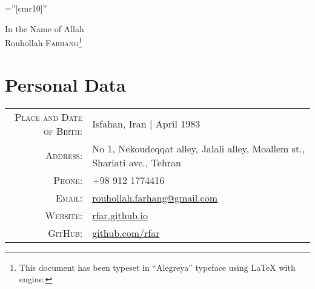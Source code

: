 \documentclass[a4paper,10pt]{article}
\begin{document}

\pagestyle{empty} %

\font\fb=''[cmr10]'' %

\par{\centering
		{\small In the Name of Allah}\\
		\vspace{22mm}
		{\Huge Rouhollah \textsc{Farhang}\footnote{This document has been typeset in “Alegreya” typeface using {\fb \LaTeX} with {\fb \XeLaTeX} engine.}
	}\bigskip\par}

\section{Personal Data}


\begin{tabular}{rl}
    \textsc{Place and Date of Birth:} & Isfahan, Iran | April 1983 \\
    \textsc{Address:}   & No 1, Nekoudeqqat alley, Jalali alley, Moallem st., Shariati ave., Tehran\\
    \textsc{Phone:}     & +98 912 1774416\\
    \textsc{Email:}     & \href{mailto:rouhollah.farhang@gmail.com}{rouhollah.farhang@gmail.com}\\
    \textsc{Website:}	& \href{https://rfar.github.io/}{rfar.github.io}\\
    \textsc{GitHub:}	& \href{https://github.com/rfar}{github.com/rfar}
\end{tabular}


\end{document}
